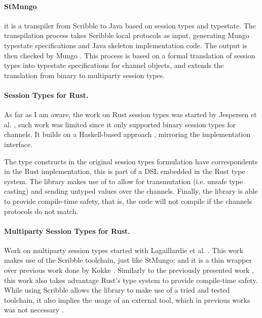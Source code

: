 \paragraph{StMungo} it is a transpiler from Scribble \autocite{Yoshida2014} to Java based on session types and typestate.
The transpilation process takes Scribble local protocols as input, generating Mungo typestate specifications and Java skeleton implementation code.
The output is then checked by Mungo \autocite{Dardha2017, Kouzapas2018, Voinea2020}.
This process is based on a formal translation of session types into typestate specifications for channel objects, and
extends the translation from binary to multiparty session types.

\paragraph{Session Types for Rust.}
As far as I am aware, the work on Rust session types was started by Jespersen et al. \autocite{Jespersen2015},
such work was limited since it only supported binary session types for channels.
It builds on a Haskell-based approach \autocite{Pucella2008}, mirroring the implementation interface.

The type constructs in the original session types formulation have correspondents in the Rust implementation,
this is part of a DSL embedded in the Rust type system.
The library makes use of  to allow for transmutation (i.e. unsafe type casting)
and sending untyped values over the channels.
Finally, the library is able to provide compile-time safety, that is, the code will not compile if the channels protocols do not match.

\paragraph{Multiparty Session Types for Rust.}
Work on multiparty session types started with Lagaillardie et al. \autocite{Lagaillardie2020}.
This work makes use of the Scribble \autocite{Yoshida2014} toolchain, just like StMungo;
and it is a thin wrapper over previous work done by Kokke \autocite{Kokke2019}.
Similarly to the previously presented work \autocite{Jespersen2015},
this work also takes advantage Rust's type system to provide compile-time safety.
While using Scribble allows the library to make use of a tried and tested toolchain,
it also implies the usage of an external tool, which in previous works was not necessary \autocite{Jespersen2015, Kokke2019}.

